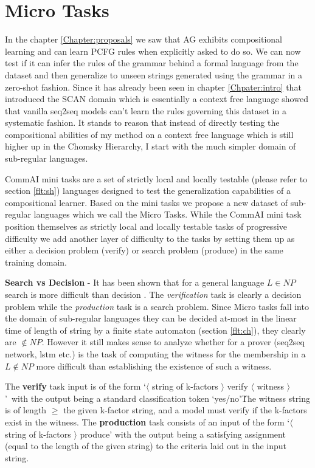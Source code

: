 \chapter{Micro Tasks}\label{Chapter:datasets}
In the chapter \ref{Chapter:proposals} we saw that AG exhibits compositional learning and can learn PCFG rules when explicitly asked to do so. We can now test if it can infer the rules of the grammar behind a formal language from the dataset and then generalize to unseen strings generated using the grammar in a zero-shot fashion. Since it has already been seen in chapter \ref{Chpater:intro} that \cite{Lake2017} introduced the SCAN domain which is essentially a context free language showed that vanilla seq2seq models can't learn the rules governing this dataset in a systematic fashion. It stands to reason that instead of directly testing the compositional abilities of my method on a context free language which is still higher up in the Chomsky Hierarchy, I start with the much simpler domain of sub-regular languages.

CommAI mini tasks \citep{Baroni2017} are a set of strictly local and locally testable (please refer to section \ref{flt:sh}) languages designed to test the generalization capabilities of a compositional learner. Based on the mini tasks we propose a new dataset of sub-regular languages which we call the Micro Tasks. While the CommAI mini task position themselves as strictly local and locally testable tasks of progressive difficulty we add another layer of difficulty to the tasks by setting them up as either a decision problem (verify) or search problem (produce) in the same training domain.

\textbf{Search vs Decision} - It has been shown that for a general language $L \in NP$ search is more difficult than decision \cite{Bellare1994}. The \textit{verification} task is clearly a decision problem while the \textit{production} task is a search problem. Since Micro tasks fall into the domain of sub-regular languages they can be decided at-most in the linear time of length of string by a finite state automaton (section \ref{flt:ch}), they clearly are $\notin NP$. However it still makes sense to analyze whether for a prover (seq2seq network, lstm etc.) is the task of computing the witness for the membership in a $L \notin NP$ more difficult than establishing the existence of such a witness.

The \textbf{verify} task input is of the form \lq $\langle$ string of k-factors $\rangle$ verify $\langle$ witness $\rangle${}\rq\ with the output being a standard classification token \lq yes/no{}\rq\. The witness string is of length $\geq$ the given k-factor string, and a model must verify if the k-factors exist in the witness. The \textbf{production} task consists of an input of the form \lq $\langle$ string of k-factors $\rangle$ produce\rq{} with the output being a satisfying assignment (equal to the length of the given string) to the criteria laid out in the input string.


